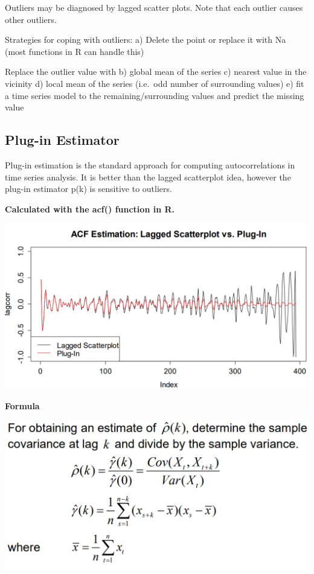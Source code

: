 \documentclass[
]{article}
\begin{document}
Outliers may be diagnosed by lagged scatter plots. Note that each
outlier causes other outliers.

Strategies for coping with outliers: a) Delete the point or replace it
with Na (most functions in R can handle this)

Replace the outlier value with b) global mean of the series c) nearest
value in the vicinity d) local mean of the series (i.e.~odd number of
surrounding values) e) fit a time series model to the
remaining/surrounding values and predict the missing value

\hypertarget{plug-in-estimator}{%
\subsection{Plug-in Estimator}\label{plug-in-estimator}}

Plug-in estimation is the standard approach for computing
autocorrelations in time series analysis. It is better than the lagged
scatterplot idea, however the plug-in estimator p(k) is sensitive to
outliers.

\textbf{Calculated with the acf() function in R.}

\includegraphics[width=1\linewidth]{comp}

\textbf{Formula}

\includegraphics[width=1\linewidth]{plugin}
\end{document}
